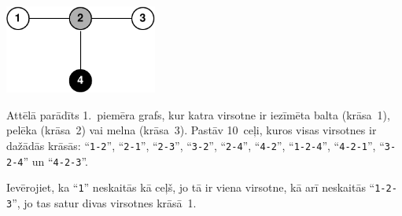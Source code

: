 \section*{}

\includegraphics[width=5cm]{pathsfig.pdf}

Attēlā parādīts 1.~piemēra grafs, kur katra virsotne ir iezīmēta balta (krāsa~1), pelēka (krāsa~2) vai melna (krāsa~3). Pastāv 10~ceļi, kuros visas virsotnes ir dažādās krāsās: ``\texttt{1-2}'', ``\texttt{2-1}'', ``\texttt{2-3}'', ``\texttt{3-2}'', ``\texttt{2-4}'', ``\texttt{4-2}'', ``\texttt{1-2-4}'', ``\texttt{4-2-1}'', ``\texttt{3-2-4}'' un ``\texttt{4-2-3}''.

Ievērojiet, ka ``\texttt{1}'' neskaitās kā ceļš, jo tā ir viena virsotne, kā arī neskaitās ``\texttt{1-2-3}'', jo tas satur divas virsotnes krāsā~1.
